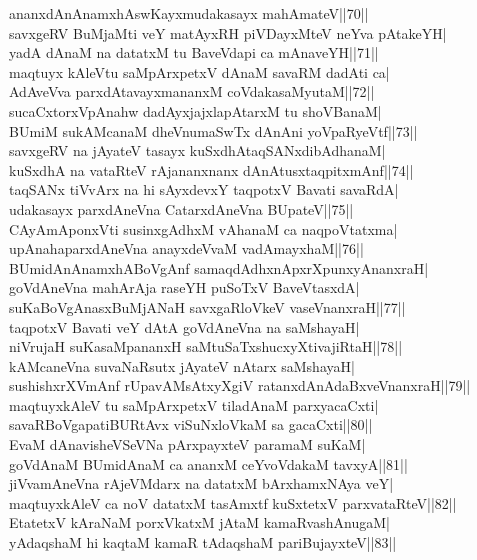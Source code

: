 \documentclass{article}
\begin{document}
ananxdAnAnamxhAswKayxmudakasayx mahAmateV||70||\\
savxgeRV BuMjaMti veY matAyxRH piVDayxMteV neYva pAtakeYH|\\
yadA dAnaM na datatxM tu BaveVdapi ca mAnaveYH||71||\\
maqtuyx kAleVtu saMpArxpetxV dAnaM savaRM dadAti ca|\\
AdAveVva parxdAtavayxmananxM coVdakasaMyutaM||72||\\
sucaCxtorxVpAnahw dadAyxjajxlapAtarxM tu shoVBanaM|\\
BUmiM sukAMcanaM dheVnumaSwTx dAnAni yoVpaRyeVtf||73||\\
savxgeRV na jAyateV tasayx kuSxdhAtaqSANxdibAdhanaM|\\
kuSxdhA na vataRteV rAjananxnanx dAnAtusxtaqpitxmAnf||74||\\
taqSANx tiVvArx na hi sAyxdevxY taqpotxV Bavati savaRdA|\\
udakasayx parxdAneVna CatarxdAneVna BUpateV||75||\\
CAyAmAponxVti susinxgAdhxM vAhanaM ca naqpoVtatxma|\\
upAnahaparxdAneVna anayxdeVvaM vadAmayxhaM||76||\\
BUmidAnAnamxhABoVgAnf samaqdAdhxnApxrXpunxyAnanxraH|\\
goVdAneVna mahArAja raseYH puSoTxV BaveVtasxdA|\\
suKaBoVgAnasxBuMjANaH savxgaRloVkeV vaseVnanxraH||77||\\
taqpotxV Bavati veY dAtA goVdAneVna na saMshayaH|\\
niVrujaH suKasaMpananxH saMtuSaTxshucxyXtivajiRtaH||78||\\
kAMcaneVna suvaNaRsutx jAyateV nAtarx saMshayaH|\\
sushishxrXVmAnf rUpavAMsAtxyXgiV ratanxdAnAdaBxveVnanxraH||79||\\
maqtuyxkAleV tu saMpArxpetxV tiladAnaM parxyacaCxti|\\
savaRBoVgapatiBURtAvx viSuNxloVkaM sa gacaCxti||80||\\
EvaM dAnavisheVSeVNa pArxpayxteV paramaM suKaM|\\
goVdAnaM BUmidAnaM ca ananxM ceYvoVdakaM tavxyA||81||\\
jiVvamAneVna rAjeVMdarx na datatxM bArxhamxNAya veY|\\
maqtuyxkAleV ca noV datatxM tasAmxtf kuSxtetxV parxvataRteV||82||\\
EtatetxV kAraNaM porxVkatxM jAtaM kamaRvashAnugaM|\\
yAdaqshaM hi kaqtaM kamaR tAdaqshaM pariBujayxteV||83||\\
\end{document}
